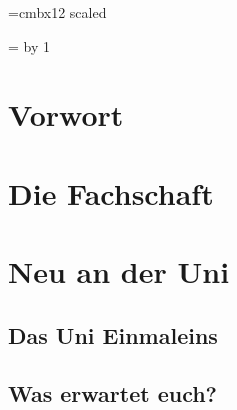 \documentclass[12pt, a4paper]{article}
\newif\ifinfo
\begin{document}
\emergencystretch=2cm

\font\vlarge=cmbx12 scaled 
\newdimen\oldbaselineskp
\newcount\auflage
\newcount\jahr
\newcount\jahrpluseins
\setcounter{secnumdepth}{0}

\newcommand*{\email}[1]{\url{#1}}
\newcommand*{\filename}[1]{\url{#1}}



\jahrpluseins=\jahr
\advance \jahrpluseins by 1

\ifinfo

\else

\fi

\ifinfo

\else

\fi


\section{Vorwort}
\ifinfo

\else

\fi


\tableofcontents
\newpage

\onecolumn
\section{Die Fachschaft}
\ifinfo

\else

\fi

\section{Neu an der Uni}
\subsection{Das Uni Einmaleins}
\ifinfo
	

\else
	


	\subsection{Was erwartet euch?}
	
\end{document}
